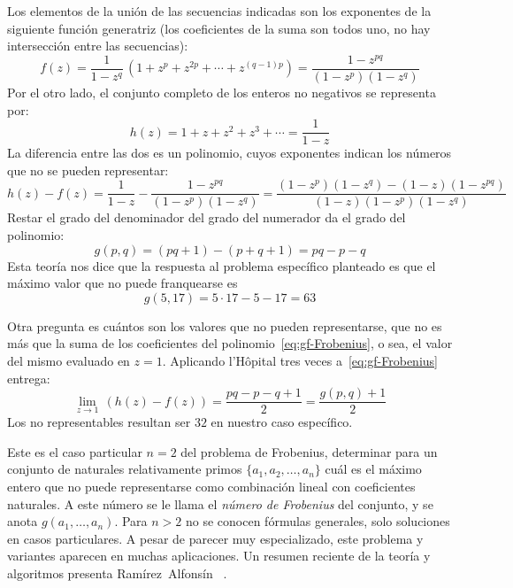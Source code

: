   Los elementos de la unión de las secuencias
  indicadas son los exponentes
  de la siguiente función generatriz
  (los coeficientes de la suma son todos uno,
   no hay intersección entre las secuencias):
  \begin{equation*}
    f(z)
      = \frac{1}{1 - z^q}
	  \, (1 + z^p + z^{2 p} + \dotsb + z^{(q - 1) p})
      = \frac{1 - z^{p q}}{(1 - z^p) (1 - z^q)}
  \end{equation*}
  Por el otro lado,
  el conjunto completo de los enteros no negativos
  se representa por:
  \begin{equation*}
    h(z)
      = 1 + z + z^2 + z^3 + \dotsb
      = \frac{1}{1 - z}
  \end{equation*}
  La diferencia entre las dos es un polinomio,
  cuyos exponentes indican los números que no se pueden representar:
  \begin{equation}
    \label{eq:gf-Frobenius}
    h(z) - f(z)
      = \frac{1}{1 - z} - \frac{1 - z^{p q}}{(1 - z^p) (1 - z^q)}
      = \frac{(1 - z^p) (1 - z^q) - (1 - z) (1 - z^{p q})}
	     {(1 - z) (1 - z^p) (1 - z^q)}
  \end{equation}
  Restar el grado del denominador del grado del numerador
  da el grado del polinomio:
  \begin{equation}
    \label{eq:Frobenius:g(p,q)}
    g(p, q)
      = (p q + 1) - (p + q + 1)
      = p q - p - q
  \end{equation}
  Esta teoría
  nos dice que la respuesta al problema específico planteado
  es que el máximo valor que no puede franquearse es
  \begin{equation*}
    g(5, 17)
      = 5 \cdot 17 - 5 - 17
      = 63
  \end{equation*}

  Otra pregunta es cuántos son los valores
  que no pueden representarse,
  que no es más que la suma de los coeficientes
  del polinomio~\eqref{eq:gf-Frobenius},
  o sea,
  el valor del mismo evaluado en \(z = 1\).
  Aplicando l'Hôpital%
  tres veces a~\eqref{eq:gf-Frobenius}
  entrega:
  \begin{equation}
    \label{eq:Frobenius-not-representable}
    \lim_{z \rightarrow 1} \, \left( h(z) - f(z) \right)
      = \frac{p q - p - q + 1}{2}
      = \frac{g(p, q) + 1}{2}
  \end{equation}
  Los no representables
  resultan ser \(32\) en nuestro caso específico.

  Este es el caso particular \(n = 2\) del problema de Frobenius,%
  determinar para un conjunto de naturales relativamente primos
  \(\{a_1, a_2, \dotsc, a_n\}\)
  cuál es el máximo entero que no puede representarse
  como combinación lineal con coeficientes naturales.
  A este número se le llama el \emph{número de Frobenius}%
  del conjunto,
  y se anota \(g(a_1, \dotsc, a_n)\).
  Para \(n > 2\) no se conocen fórmulas generales,
  solo soluciones en casos particulares.
  A pesar de parecer muy especializado,
  este problema y variantes aparecen en muchas aplicaciones.
  Un resumen reciente de la teoría y algoritmos
  presenta Ramírez~Alfonsín~%
    \cite{ramirez06:_dioph_frobenius_probl}.


